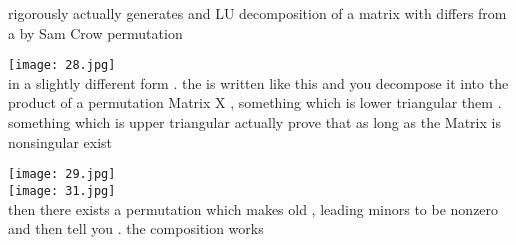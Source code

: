 \documentclass{article}
\begin{document}
rigorously actually generates and LU decomposition of a matrix with differs from a by Sam Crow permutation

\texttt{[image: 28.jpg]}\\

in a slightly different form . the is written like this and you decompose it into the product of a permutation Matrix X , something which is lower triangular them . something which is upper triangular actually prove that as long as the Matrix is nonsingular exist

\texttt{[image: 29.jpg]}\\



\texttt{[image: 31.jpg]}\\

then there exists a permutation which makes old , leading minors to be nonzero and then tell you . the composition works
\end{document}
